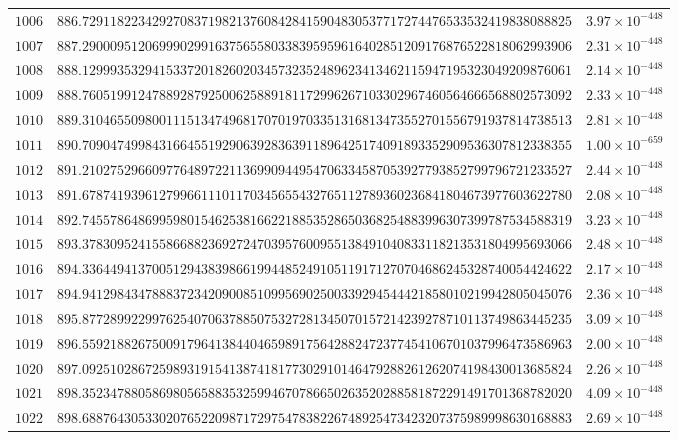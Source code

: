 \documentclass[12pt,reqno]{amsart}
\theoremstyle{remark}
\begin{document}
\begin{longtable}{clc}
$1006$ & $886.7291182234292708371982137608428415904830537717274476533532419838088825$ & $3.97\times 10^{-448}$ \\
$1007$ & $887.2900095120699902991637565580338395959616402851209176876522818062993906$ & $2.31\times 10^{-448}$ \\
$1008$ & $888.1299935329415337201826020345732352489623413462115947195323049209876061$ & $2.14\times 10^{-448}$ \\
$1009$ & $888.7605199124788928792500625889181172996267103302967460564666568802573092$ & $2.33\times 10^{-448}$ \\
$1010$ & $889.3104655098001115134749681707019703351316813473552701556791937814738513$ & $2.81\times 10^{-448}$ \\
$1011$ & $890.7090474998431664551929063928363911896425174091893352909536307812338355$ & $1.00\times 10^{-659}$ \\
$1012$ & $891.2102752966097764897221136990944954706334587053927793852799796721233527$ & $2.44\times 10^{-448}$ \\
$1013$ & $891.6787419396127996611101170345655432765112789360236841804673977603622780$ & $2.08\times 10^{-448}$ \\
$1014$ & $892.7455786486995980154625381662218853528650368254883996307399787534588319$ & $3.23\times 10^{-448}$ \\
$1015$ & $893.3783095241558668823692724703957600955138491040833118213531804995693066$ & $2.48\times 10^{-448}$ \\
$1016$ & $894.3364494137005129438398661994485249105119171270704686245328740054424622$ & $2.17\times 10^{-448}$ \\
$1017$ & $894.9412984347888372342090085109956902500339294544421858010219942805045076$ & $2.36\times 10^{-448}$ \\
$1018$ & $895.8772899229976254070637885075327281345070157214239278710113749863445235$ & $3.09\times 10^{-448}$ \\
$1019$ & $896.5592188267500917964138440465989175642882472377454106701037996473586963$ & $2.00\times 10^{-448}$ \\
$1020$ & $897.0925102867259893191541387418177302910146479288261262074198430013685824$ & $2.26\times 10^{-448}$ \\
$1021$ & $898.3523478805869805658835325994670786650263520288581872291491701368782020$ & $4.09\times 10^{-448}$ \\
$1022$ & $898.6887643053302076522098717297547838226748925473423207375989998630168883$ & $2.69\times 10^{-448}$ \\

\end{longtable}
\end{document}
